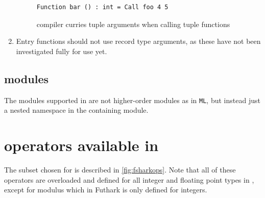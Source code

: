 \begin{enumerate}
\begin{figure}[H]
\begin{verbatim}
Function bar () : int = Call foo 4 5
\end{verbatim}
    \caption{\fsharp{} compiler curries tuple arguments when calling tuple functions}
    \label{fig:astcurried'}
  \end{figure}

\item Entry functions should not use record type arguments, as these have not
  been investigated fully for \fshark{} use yet.
\end{enumerate}

\subsection{\fshark{} modules}
\label{noteonfsharkmodules}
The modules supported in \fshark{} are not higher-order modules as in
\texttt{ML}, but instead just a nested namespace in the containing module.

\section{\fsharp{} operators available in \fshark{}}
The \fsharp{} subset chosen for \fshark{} is described in \ref{fig:fsharkops}.
Note that all of these operators are overloaded and defined for all integer
and floating point types in \fsharp{}, except for modulus which in Futhark is
only defined for integers.

